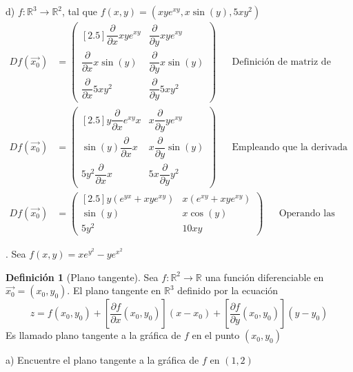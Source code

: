 \documentclass[letterpaper]{article}
\renewcommand{\d}{\partial}
\newcommand{\R}{\mathds{R}}
\renewcommand{\*}{\cdot}
\theoremstyle{definition}
\newtheorem{definition}{Definición}
\begin{document}
\noindent d) $f: \mathbb{R}^3  \longrightarrow \mathbb{R}^2$, tal que $f(x,y) = (xye^{xy}, x\sin(y), 5xy^2)$
\begin{align*}
	Df(\vec{x_0}) &= \begin{pmatrix}[2.5]
	\dfrac{\d }{\d x} xye^{xy}  & \dfrac{\d }{\d y} xye^{xy} \\
	\dfrac{\d }{\d x} x\sin(y) & \dfrac{\d }{\d y} x\sin(y) \\
	\dfrac{\d }{\d x}  5xy^2 & \dfrac{\d }{\d y}  5xy^2
	\end{pmatrix} && \text{Definición de matriz de derivadas parciales}\\
	Df(\vec{x_0}) &= \begin{pmatrix}[2.5]
	y\dfrac{\d }{\d x} e^{xy}x  & x\dfrac{\d }{\d y} ye^{xy}\\
	\sin(y)\dfrac{\d }{\d x} x & x\dfrac{\d }{\d y} \sin(y) \\
	5y^2\dfrac{\d }{\d x}  x & 5x\dfrac{\d }{\d y}  y^2 
	\end{pmatrix} && \text{Empleando que la derivada es operador lineal}
\end{align*}
\begin{align*}
	Df(\vec{x_0}) &= \begin{pmatrix}[2.5]
	y(e^{yx} + xye^{xy})  & x(e^{xy} + xye^{xy}) \\
	\sin(y) & x\cos(y)\\
	5y^2 & 10xy
	\end{pmatrix} && \text{Operando las dervidas parciales}
\end{align*}

.  Sea $f(x,y) = xe^{y^2} - ye^{x^2}$\\

\begin{definition}[Plano tangente]
	Sea $ f: \R^2 \to \R $ una función diferenciable en $ \vec{x_0} = (x_0, y_0) $. El plano tangente en $ \R^3 $ definido por la ecuación
	\[ z = f(x_0, y_0) + \left[ \dfrac{\d f}{\d x} (x_0, y_0) \right](x - x_0) + \left[ \dfrac{\d f}{\d y}(x_0, y_0) \right](y-y_0) \]
	Es llamado plano tangente a la gráfica de $ f $ en el punto $ (x_0,y_0) $
\end{definition}
\noindent a) Encuentre el plano tangente a la gráfica de $f$ en $(1, 2)$
\end{document}
